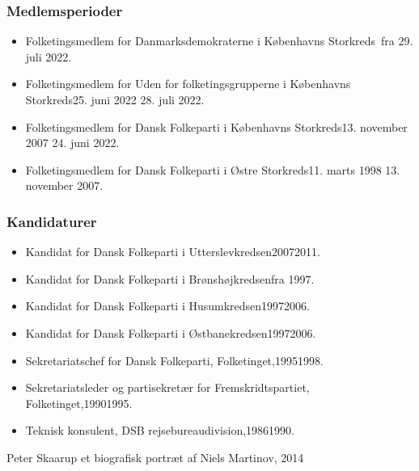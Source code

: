 \documentclass[11pt, a4paper]{awesome-cv}
\begin{document}
\begin{cvletter}
\subsubsection*{Medlemsperioder}
\begin{itemize}
\item Folketingsmedlem for Danmarksdemokraterne i Københavns Storkreds fra 29. juli 2022.
\item Folketingsmedlem for Uden for folketingsgrupperne i Københavns Storkreds25. juni 2022  28. juli 2022.
\item Folketingsmedlem for Dansk Folkeparti i Københavns Storkreds13. november 2007  24. juni 2022.
\item Folketingsmedlem for Dansk Folkeparti i Østre Storkreds11. marts 1998  13. november 2007.
\end{itemize}
\subsubsection*{Kandidaturer}
\begin{itemize}
\item Kandidat for Dansk Folkeparti i Utterslevkredsen20072011.
\item Kandidat for Dansk Folkeparti i Brønshøjkredsenfra 1997.
\item Kandidat for Dansk Folkeparti i Husumkredsen19972006.
\item Kandidat for Dansk Folkeparti i Østbanekredsen19972006.
\end{itemize}
\begin{itemize}
\item Sekretariatschef for Dansk Folkeparti, Folketinget,19951998.
\item Sekretariatsleder og partisekretær for Fremskridtspartiet, Folketinget,19901995.
\item Teknisk konsulent, DSB rejsebureaudivision,19861990.
\end{itemize}
Peter Skaarup  et biografisk portræt af Niels Martinov, 2014

\end{cvletter}
\end{document}
